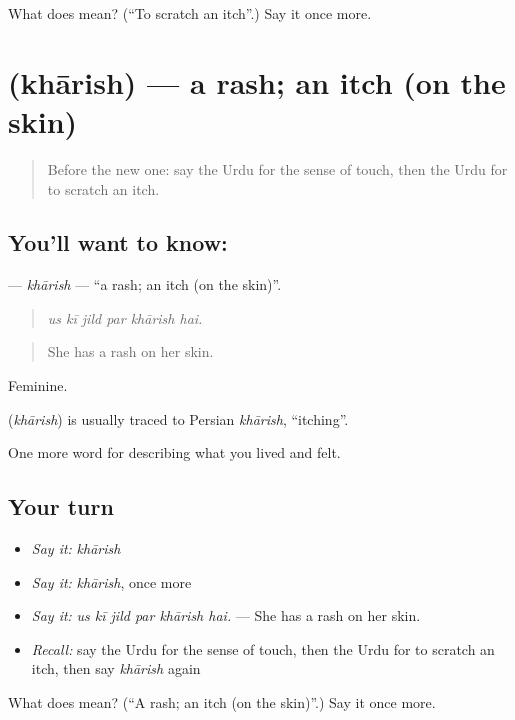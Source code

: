 \begin{tcolorbox}[breakable,colback=teal!4,colframe=teal!35!black,title={Before you move on}]
What does  mean? (\textquotedblleft{}To scratch an itch\textquotedblright{}.) Say it once more.
\end{tcolorbox}
\section[\texorpdfstring{\ur{خارش} (khārish)}{خارش (khārish)}]{ (khārish) — a rash; an itch (on the skin)}

\label{lesson:UR-C468-kharish}



\begin{quote}
Before the new one: say the Urdu for the sense of touch, then the Urdu for to scratch an itch.
\end{quote}

\subsection*{You'll want to know: }
\textbf{} — \emph{khārish} — \textquotedblleft{}a rash; an itch (on the skin)\textquotedblright{}.

\begin{quote}
     
\end{quote}

\begin{quote}
\emph{us kī jild par khārish hai.}
\end{quote}

\begin{quote}
She has a rash on her skin.
\end{quote}

Feminine.

\begin{cousinweb}
\textbf{} (\emph{khārish}) is usually traced to Persian \emph{khārish}, \textquotedblleft{}itching\textquotedblright{}.
\end{cousinweb}

\begin{grammarlens}[title={What you've built}]
One more word for describing what you lived and felt.
\end{grammarlens}

\subsection*{Your turn}
\begin{itemize}
\raggedright
  \item \emph{Say it:} \emph{khārish}
  \item \emph{Say it:} \emph{khārish}, once more
  \item \emph{Say it:} \emph{us kī jild par khārish hai.} — She has a rash on her skin.
  \item \emph{Recall:} say the Urdu for the sense of touch, then the Urdu for to scratch an itch, then say \emph{khārish} again
\end{itemize}

\begin{tcolorbox}[breakable,colback=teal!4,colframe=teal!35!black,title={Before you move on}]
What does  mean? (\textquotedblleft{}A rash; an itch (on the skin)\textquotedblright{}.) Say it once more.
\end{tcolorbox}
